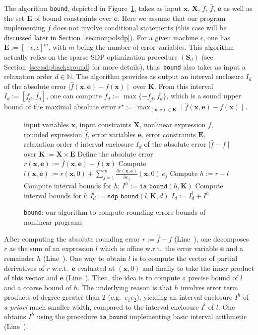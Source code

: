 \documentclass[preprint,fleqn,nocopyrightspace]{sigplanconf}
\newcommand{\code}[1]{\lstinline{#1}}
\newcommand{\N}{\mathbb{N}}
\newcommand{\x}{\mathbf{x}}
\newcommand{\e}{\mathbf{e}}
\def\S{\mathbf{S}}
\def\E{\mathbf{E}}
\def\K{\mathbf{K}}
\def\S{\mathbf{S}}
\def\X{\mathbf{X}}
\newcommand{\iaboundfun}[2]{\mathtt{ia\_bound}(#1, #2)}
\newcommand{\iabound}{\mathtt{ia\_bound}}
\newcommand{\sdpboundfun}[3]{\mathtt{sdp\_bound}(#1, #2, #3)}
\theoremstyle{plain}
\begin{document}
The algorithm \code{bound}, depicted in Figure~\ref{alg:bound}, takes as input $\x$, $\X$, $f$, $\hat{f}$, $\e$ as well as the set $\E$ of bound constraints over $\e$. Here we assume that our program implementing $f$ does not involve conditional statements (this case will be discussed later in Section~\ref{sec:nonpolsdp}). For a given machine $\epsilon$, one has $\E := [-\epsilon, \epsilon]^m$, with $m$ being the number of error variables. This algorithm actually relies on the sparse SDP optimization procedure $(\S_d)$ (see Section~\ref{sec:sdpbackground} for more details), thus~\code{bound} also takes as input a relaxation order $d \in \N$. The algorithm provides as output an interval enclosure $I_d$ of the absolute error $\mid \hat{f}(\x,\e) - f(\x) \mid$ over $\K$. 
From this interval $I_d:= [\underline{f_d}, \overline{f_d}]$, one can compute $f_d := \max \{- \underline{f_d}, \overline{f_d} \}$, which is a sound upper bound of the maximal absolute error $r^\star := \max_{(\x,\e)\in \K} \mid \hat{f}(\x,\e) - f(\x) \mid $.

\begin{figure}[!ht]
\begin{algorithmic}[1]                    
\Require input variables $\x$, input constraints $\X$, nonlinear expression $f$, rounded expression $\hat{f}$, error variables $\e$, error constraints $\E$, relaxation order $d$
\Ensure interval enclosure $I_d$ of the absolute error $\mid \hat{f} - f  \mid$ over $\K := \X \times \E$
\State Define the absolute error $r(\x, \e) := \hat{f}(\x,\e) - f(\x)$ \label{line:r}
\State Compute $l(\x,\e) := r(\x, 0) + \sum_{j=1}^m \frac{\partial r(\x,\e)} {\partial e_j} (\x,0) \, e_j$ \label{line:l}
\State Compute $h := r - l$ \label{line:h}
\State Compute interval bounds for $h$: $I^h := \iaboundfun{h}{\K}$ \label{line:iabound}
\State Compute interval bounds for $l$: $I_d^l := \sdpboundfun{l}{\K}{d}$  \label{line:sdpbound}
\State \Return $I_d := I_d^l + I^h$ 
\end{algorithmic}
\caption{\code{bound}: our algorithm to compute rounding errors bounds of nonlinear programs}
\label{alg:bound}
\end{figure}

After computing the absolute rounding error $r := \hat{f} - f$ (Line~), one decomposes $r$ as the sum of an expression $l$ which is affine w.r.t.~the error variable $\e$ and a remainder $h$ (Line~). One way to obtain $l$ is to compute the vector of partial derivatives of $r$ w.r.t.~$\e$ evaluated at $(\x, 0)$ and finally to take the inner product of this vector and $\e$ (Line~). Then, the idea is to compute a precise bound of $l$ and a coarse bound of $h$. The underlying reason is that $h$ involves error term products of degree greater than 2 (e.g.~$e_1 e_2$), yielding an interval enclosure $I^h$ of \textit{a priori} much smaller width, compared to the interval enclosure $I^l$ of $l$. One obtains $I^h$ using the procedure $\iabound$ implementing basic interval arithmetic (Line~). 
%
\vspace*{-0.2cm}
\end{document}
